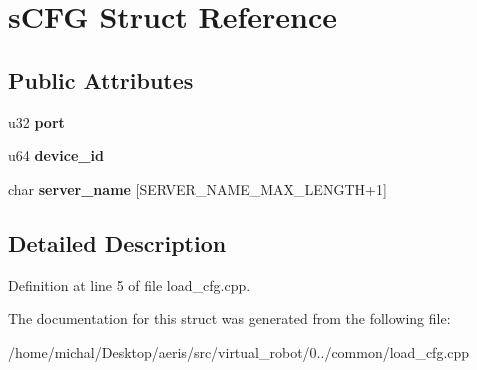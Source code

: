 \hypertarget{structsCFG}{\section{s\-C\-F\-G Struct Reference}
\label{structsCFG}
}
\subsection*{Public Attributes}
\begin{DoxyCompactItemize}
\item 
\hypertarget{structsCFG_a5843faf50da251a07302ce4eee81e588}{u32 {\bfseries port}}\label{structsCFG_a5843faf50da251a07302ce4eee81e588}

\item 
\hypertarget{structsCFG_a97012388819824e5504e0e3c3d721cae}{u64 {\bfseries device\-\_\-id}}\label{structsCFG_a97012388819824e5504e0e3c3d721cae}

\item 
\hypertarget{structsCFG_afac8663ae031a58a4e13dcb0fd71d3cd}{char {\bfseries server\-\_\-name} \mbox{[}S\-E\-R\-V\-E\-R\-\_\-\-N\-A\-M\-E\-\_\-\-M\-A\-X\-\_\-\-L\-E\-N\-G\-T\-H+1\mbox{]}}\label{structsCFG_afac8663ae031a58a4e13dcb0fd71d3cd}

\end{DoxyCompactItemize}


\subsection{Detailed Description}


Definition at line 5 of file load\-\_\-cfg.\-cpp.



The documentation for this struct was generated from the following file\-:\begin{DoxyCompactItemize}
\item 
/home/michal/\-Desktop/aeris/src/virtual\-\_\-robot/0../common/load\-\_\-cfg.\-cpp\end{DoxyCompactItemize}
